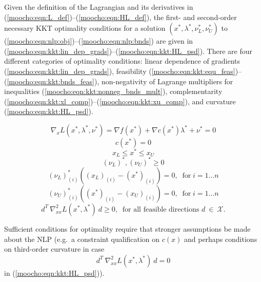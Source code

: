 \documentclass[pdf,ps2pdf,11pt]{SANDreport}
\begin{document}
Given the definition of the Lagrangian and its derivatives in
(\ref{moocho:eqn:L_def})--(\ref{moocho:eqn:HL_def}), the first- and
second-order necessary KKT optimality conditions {}\cite{ref:nash_sofer_1996}
for a solution $(x^*, \lambda^*, \nu^*_L, \nu^*_U)$ to
(\ref{moocho:eqn:nlp:obj})--(\ref{moocho:eqn:nlp:bnds}) are given in
(\ref{moocho:eqn:kkt:lin_dep_grads})--(\ref{moocho:eqn:kkt:HL_psd}).  There
are four different categories of optimality conditions: linear dependence of
gradients (\ref{moocho:eqn:kkt:lin_dep_grads}), feasibility
(\ref{moocho:eqn:kkt:equ_feas})--(\ref{moocho:eqn:kkt:bnds_feas}),
non-negativity of Lagrange multipliers for inequalities
(\ref{moocho:eqn:kkt:nonneg_bnds_mult}), complementarity
(\ref{moocho:eqn:kkt:xl_comp})--(\ref{moocho:eqn:kkt:xu_comp}), and curvature
(\ref{moocho:eqn:kkt:HL_psd}).

{\bsinglespace
\begin{equation}
\nabla_{x} L(x^*,\lambda^*,\nu^*) = \nabla f(x^*) + \nabla c(x^*) \lambda^* + \nu^* = 0
\label{moocho:eqn:kkt:lin_dep_grads}
\end{equation}
%
\begin{equation}
c(x^*) = 0
\label{moocho:eqn:kkt:equ_feas}
\end{equation}
%
\begin{equation}
x_L \leq x^* \leq x_U
\label{moocho:eqn:kkt:bnds_feas}
\end{equation}
%
\begin{equation}
(\nu_L)^*, (\nu_U)^* \geq 0
\label{moocho:eqn:kkt:nonneg_bnds_mult}
\end{equation}
%
\begin{equation}
(\nu_L)^*_{(i)} ( (x_L)_{(i)} - (x^*)_{(i)} ) = 0, \;\; \mbox{for} \; i = 1 \ldots n
\label{moocho:eqn:kkt:xl_comp}
\end{equation}
%
\begin{equation}
(\nu_U)^*_{(i)} ( (x^*)_{(i)} - (x_U)_{(i)} ) = 0, \;\; \mbox{for} \; i = 1 \ldots n
\label{moocho:eqn:kkt:xu_comp}
\end{equation}
%
\begin{equation}
d^T \: \nabla_{xx}^2 L(x^*,\lambda^*) \: d \geq 0, \;\; \mbox{for all feasible directions $d \:\in\:\mathcal{X}$}.
\label{moocho:eqn:kkt:HL_psd}
\end{equation}
\esinglespace}

Sufficient conditions for optimality require that stronger assumptions be made
about the NLP (e.g.\ a constraint qualification on $c(x)$ and perhaps
conditions on third-order curvature in case
%
\[
d^T \: \nabla_{xx}^2 L(x^*,\lambda^*) \: d = 0
\]
%
in (\ref{moocho:eqn:kkt:HL_psd})).
\end{document}
